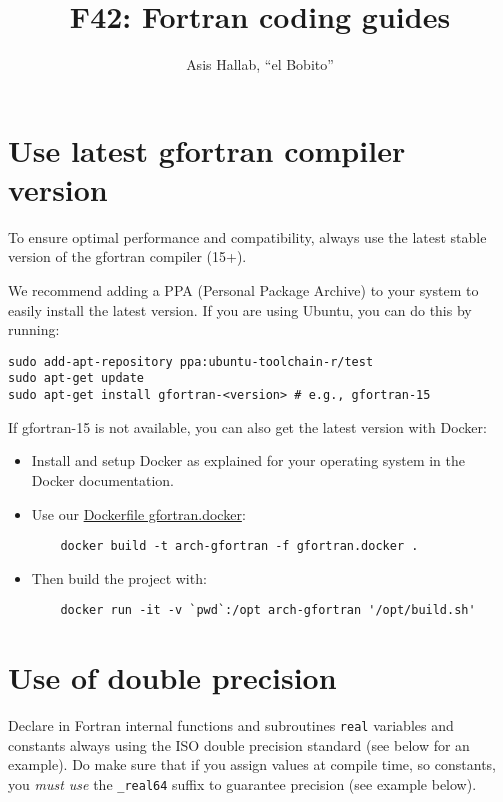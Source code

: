 \documentclass{article}
\title{F42: Fortran coding guides}
\author{Asis Hallab, ``el Bobito''}
\begin{document}
\maketitle

\tableofcontents
\vspace{1cm}

\newpage
\section{Use latest gfortran compiler version}

To ensure optimal performance and compatibility, always use the latest stable version of the gfortran compiler (15+). 

\noindent We recommend adding a PPA (Personal Package Archive) to your system to easily install the latest version. If you are using Ubuntu, you can do this by running:
\begin{verbatim}
sudo add-apt-repository ppa:ubuntu-toolchain-r/test
sudo apt-get update
sudo apt-get install gfortran-<version> # e.g., gfortran-15 
\end{verbatim}

\noindent If gfortran-15 is not available, you can also get the latest version with Docker: 
{\begin{itemize}
  \item Install and setup Docker as explained for your operating system in the Docker documentation.
  \item Use our \href{https://gitlab.rlp.net/a.hallab/tensor-omics/-/blob/main/misc/gfortran.docker?ref_type=heads}{Dockerfile gfortran.docker}: 
  \begin{verbatim}
    docker build -t arch-gfortran -f gfortran.docker . 
  \end{verbatim}
  \item Then build the project with:
  \begin{verbatim}
    docker run -it -v `pwd`:/opt arch-gfortran '/opt/build.sh'
  \end{verbatim}
\end{itemize}}

\section{Use of double precision}

Declare in Fortran internal functions and subroutines \texttt{real} variables and constants always using the ISO double precision standard (see below for an example). Do make sure that if you assign values at compile time, so constants, you \emph{must use} the \texttt{\_real64} suffix to guarantee precision (see example below).
\end{document}
